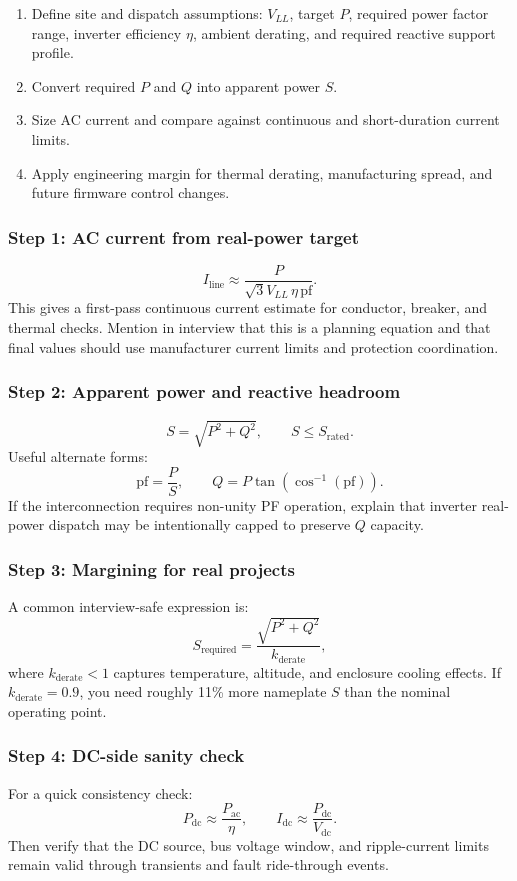 \documentclass[11pt]{article}
\begin{document}
\begin{enumerate}
  \item Define site and dispatch assumptions: \(V_{LL}\), target \(P\), required power factor range, inverter efficiency \(\eta\), ambient derating, and required reactive support profile.
  \item Convert required \(P\) and \(Q\) into apparent power \(S\).
  \item Size AC current and compare against continuous and short-duration current limits.
  \item Apply engineering margin for thermal derating, manufacturing spread, and future firmware control changes.
\end{enumerate}

\subsubsection*{Step 1: AC current from real-power target}
\[
I_{\mathrm{line}} \approx \frac{P}{\sqrt{3}V_{LL}\,\eta\,\mathrm{pf}}.
\]
This gives a first-pass continuous current estimate for conductor, breaker, and
thermal checks. Mention in interview that this is a planning equation and that
final values should use manufacturer current limits and protection coordination.

\subsubsection*{Step 2: Apparent power and reactive headroom}
\[
S = \sqrt{P^2 + Q^2}, \qquad S \le S_{\mathrm{rated}}.
\]
Useful alternate forms:
\[
\mathrm{pf} = \frac{P}{S}, \qquad Q = P\tan(\cos^{-1}(\mathrm{pf})).
\]
If the interconnection requires non-unity PF operation, explain that inverter
real-power dispatch may be intentionally capped to preserve \(Q\) capacity.

\subsubsection*{Step 3: Margining for real projects}
A common interview-safe expression is:
\[
S_{\mathrm{required}} = \frac{\sqrt{P^2 + Q^2}}{k_{\mathrm{derate}}},
\]
where \(k_{\mathrm{derate}} < 1\) captures temperature, altitude, and enclosure
cooling effects. If \(k_{\mathrm{derate}} = 0.9\), you need roughly 11\% more
nameplate \(S\) than the nominal operating point.

\subsubsection*{Step 4: DC-side sanity check}
For a quick consistency check:
\[
P_{\mathrm{dc}} \approx \frac{P_{\mathrm{ac}}}{\eta}, \qquad
I_{\mathrm{dc}} \approx \frac{P_{\mathrm{dc}}}{V_{\mathrm{dc}}}.
\]
Then verify that the DC source, bus voltage window, and ripple-current limits
remain valid through transients and fault ride-through events.
\end{document}
